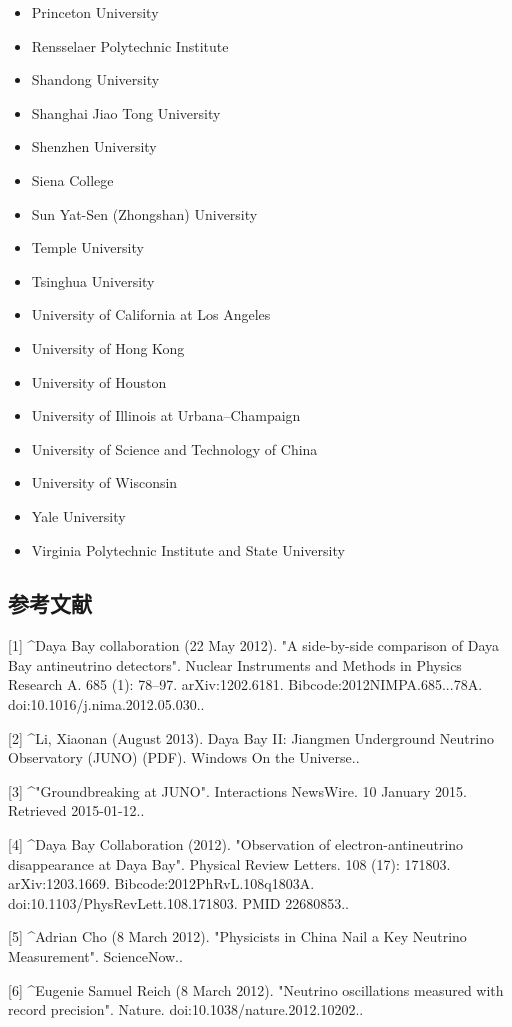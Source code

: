 \begin{itemize}
\item Princeton University
\item Rensselaer Polytechnic Institute
\item Shandong University
\item Shanghai Jiao Tong University
\item Shenzhen University
\item Siena College
\item Sun Yat-Sen (Zhongshan) University
\item Temple University
\item Tsinghua University
\item University of California at Los Angeles
\item University of Hong Kong
\item University of Houston
\item University of Illinois at Urbana–Champaign
\item University of Science and Technology of China
\item University of Wisconsin
\item Yale University
\item Virginia Polytechnic Institute and State University
\end{itemize}

\subsection{参考文献}
[1]
^Daya Bay collaboration (22 May 2012). "A side-by-side comparison of Daya Bay antineutrino detectors". Nuclear Instruments and Methods in Physics Research A. 685 (1): 78–97. arXiv:1202.6181. Bibcode:2012NIMPA.685...78A. doi:10.1016/j.nima.2012.05.030..

[2]
^Li, Xiaonan (August 2013). Daya Bay II: Jiangmen Underground Neutrino Observatory (JUNO) (PDF). Windows On the Universe..

[3]
^"Groundbreaking at JUNO". Interactions NewsWire. 10 January 2015. Retrieved 2015-01-12..

[4]
^Daya Bay Collaboration (2012). "Observation of electron-antineutrino disappearance at Daya Bay". Physical Review Letters. 108 (17): 171803. arXiv:1203.1669. Bibcode:2012PhRvL.108q1803A. doi:10.1103/PhysRevLett.108.171803. PMID 22680853..

[5]
^Adrian Cho (8 March 2012). "Physicists in China Nail a Key Neutrino Measurement". ScienceNow..

[6]
^Eugenie Samuel Reich (8 March 2012). "Neutrino oscillations measured with record precision". Nature. doi:10.1038/nature.2012.10202..

